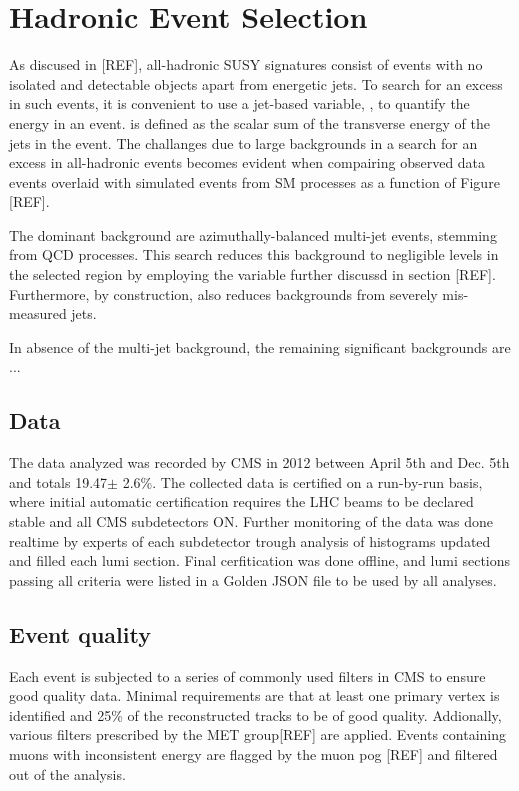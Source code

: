 \clearpage
\section{Hadronic Event Selection\label{sec:eventSelection}}
As discused in [REF], all-hadronic SUSY signatures consist of events with
no isolated and detectable objects apart from energetic jets. To search
for an excess in such events, it is convenient to use a jet-based variable,
\scalht, to quantify the energy in an event.  \scalht is defined as the scalar
sum of the transverse energy of the jets in the event. The challanges due to large
backgrounds in a search for an excess in all-hadronic events becomes evident 
when compairing observed data events overlaid with simulated events from 
SM processes as a function of \scalht Figure [REF].
 
The dominant background are azimuthally-balanced multi-jet events, stemming from QCD
processes. This search reduces this background to negligible levels in the
selected region by employing the \alphat variable further discussd in section [REF].
Furthermore, by construction, \alphat also reduces backgrounds from severely mis-measured
jets. 

In absence of the multi-jet background, the remaining significant backgrounds are ...

\subsection{Data}
The data analyzed was recorded by CMS in 2012 between April 5th and Dec. 5th and
totals 19.47$\pm$ 2.6\%. The collected data is certified on a run-by-run 
basis, where initial automatic certification requires the LHC beams to be declared
stable and all CMS subdetectors ON. Further monitoring of the data was done realtime
by experts of each subdetector trough analysis of histograms updated and filled
each lumi section. Final cerfitication was done offline, and lumi sections passing
all criteria were listed in a Golden JSON file to be used by all analyses. 

\subsection{Event quality}

Each event is subjected to a series of commonly used filters in CMS to ensure good
quality data. Minimal requirements are that at least one primary vertex is identified 
and 25\% of the reconstructed tracks to be of good quality. Addionally, various filters 
prescribed by the MET group[REF] are applied. Events containing muons with inconsistent
energy are flagged by the muon pog [REF] and filtered out of the analysis. 


